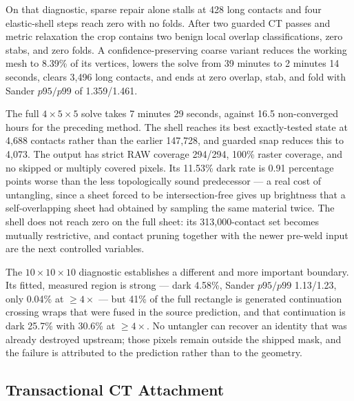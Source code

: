 On that diagnostic, sparse repair alone stalls at 428 long contacts and four elastic-shell steps reach zero with no folds. After two guarded CT passes and metric relaxation the crop contains two benign local overlap classifications, zero stabs, and zero folds. A confidence-preserving coarse variant reduces the working mesh to 8.39\% of its vertices, lowers the solve from 39 minutes to 2 minutes 14 seconds, clears 3,496 long contacts, and ends at zero overlap, stab, and fold with Sander $p95/p99$ of 1.359/1.461.

The full $4\times5\times5$ solve takes 7 minutes 29 seconds, against 16.5 non-converged hours for the preceding method. The shell reaches its best exactly-tested state at 4,688 contacts rather than the earlier 147,728, and guarded snap reduces this to 4,073. The output has strict RAW coverage 294/294, 100\% raster coverage, and no skipped or multiply covered pixels. Its 11.53\% dark rate is 0.91 percentage points worse than the less topologically sound predecessor --- a real cost of untangling, since a sheet forced to be intersection-free gives up brightness that a self-overlapping sheet had obtained by sampling the same material twice. The shell does not reach zero on the full sheet: its 313,000-contact set becomes mutually restrictive, and contact pruning together with the newer pre-weld input are the next controlled variables.

The $10\times10\times10$ diagnostic establishes a different and more important boundary. Its fitted, measured region is strong --- dark 4.58\%, Sander $p95/p99$ 1.13/1.23, only 0.04\% at $\ge 4\times$ --- but 41\% of the full rectangle is generated continuation crossing wraps that were fused in the source prediction, and that continuation is dark 25.7\% with 30.6\% at $\ge4\times$. No untangler can recover an identity that was already destroyed upstream; those pixels remain outside the shipped mask, and the failure is attributed to the prediction rather than to the geometry.

\subsection{Transactional CT Attachment}
\label{sec:attach}


